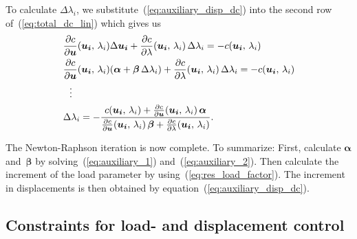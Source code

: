 To calculate $\Delta \lambda_i$, we substitute~(\ref{eq:auxiliary_disp_dc}) into the second row of~(\ref{eq:total_dc_lin}) which gives us
%
\begin{align}
&\frac{\partial c}{\partial \boldsymbol{u}}(\boldsymbol{u_{i}},\,\lambda_{i})\Delta\boldsymbol{u_{i}} + \frac{\partial c}{\partial \lambda}(\boldsymbol{u_{i}},\,\lambda_{i})\,\Delta \lambda_{i} = -c(\boldsymbol{u_{i}},\,\lambda_{i})\notag\\
&\frac{\partial c}{\partial \boldsymbol{u}}(\boldsymbol{u_{i}},\,\lambda_{i})(\boldsymbol{\alpha} + \boldsymbol{\beta}\,\Delta \lambda_{i}) + \frac{\partial c}{\partial \lambda}(\boldsymbol{u_{i}},\,\lambda_{i})\,\Delta \lambda_{i} = -c(\boldsymbol{u_{i}},\,\lambda_{i})\notag\\
&\ \ \vdots\notag\\
&\Delta \lambda_{i} = -\frac{c(\boldsymbol{u_{i}},\,\lambda_{i}) + \frac{\partial c}{\partial \boldsymbol{u}}(\boldsymbol{u_{i}},\,\lambda_{i})\,\boldsymbol{\alpha}}{\frac{\partial c}{\partial \boldsymbol{u}}(\boldsymbol{u_{i}},\,\lambda_{i})\,\boldsymbol{\beta} + \frac{\partial c}{\partial \lambda}(\boldsymbol{u_{i}},\,\lambda_{i})}.\label{eq:res_load_factor}
\end{align}

The Newton-Raphson iteration is now complete. To summarize: First, calculate $\boldsymbol{\alpha}$ and~$\boldsymbol{\beta}$ by solving~(\ref{eq:auxiliary_1}) and~(\ref{eq:auxiliary_2}). Then calculate the increment of the load parameter by using~(\ref{eq:res_load_factor}). The increment in displacements is then obtained by equation~(\ref{eq:auxiliary_disp_dc}).\\

\subsection{Constraints for load- and displacement control}

